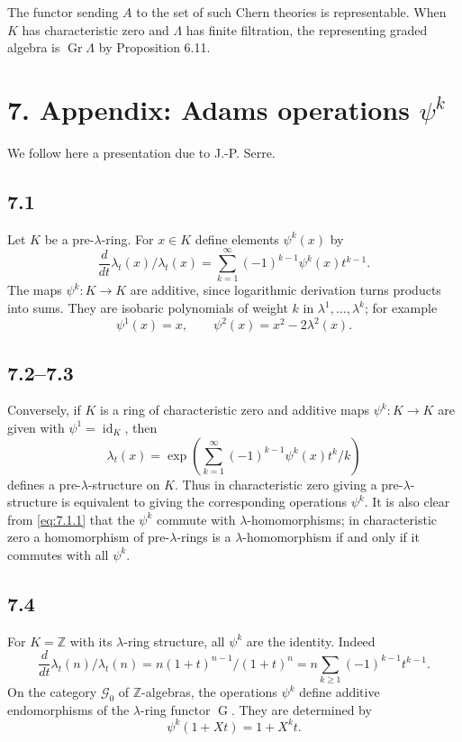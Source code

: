 \documentclass[11pt]{article}
\theoremstyle{plain}
\theoremstyle{definition}
\theoremstyle{remark}
\newcommand{\ZZ}{\mathbb Z}
\DeclareMathOperator{\Gr}{Gr}
\DeclareMathOperator{\id}{id}
\providecommand{\Go}{\operatorname{G}}
\begin{document}
The functor sending $A$ to the set of such Chern theories is representable. When $K$ has characteristic zero and $\Lambda$ has finite filtration, the representing graded algebra is $\Gr\Lambda$ by Proposition 6.11.

\section*{7. Appendix: Adams operations $\psi^k$}

We follow here a presentation due to J.-P. Serre.

\subsection*{7.1}
Let $K$ be a pre-$\lambda$-ring. For $x\in K$ define elements $\psi^k(x)$ by
\begin{equation}\label{eq:7.1.1}
\frac{d}{dt}\lambda_t(x)\big/\lambda_t(x)=\sum_{k=1}^{\infty}(-1)^{k-1}\psi^k(x)t^{k-1}.
\end{equation}
The maps $\psi^k:K\to K$ are additive, since logarithmic derivation turns products into sums. They are isobaric polynomials of weight $k$ in $\lambda^1,\ldots,\lambda^k$; for example
\[
\psi^1(x)=x,
\qquad
\psi^2(x)=x^2-2\lambda^2(x).
\]

\subsection*{7.2--7.3}
Conversely, if $K$ is a ring of characteristic zero and additive maps $\psi^k:K\to K$ are given with $\psi^1=\id_K$, then
\begin{equation}\label{eq:7.2.1}
\lambda_t(x)=\exp\left(\sum_{k=1}^{\infty}(-1)^{k-1}\psi^k(x)t^k/k\right)
\end{equation}
defines a pre-$\lambda$-structure on $K$. Thus in characteristic zero giving a pre-$\lambda$-structure is equivalent to giving the corresponding operations $\psi^k$. It is also clear from \eqref{eq:7.1.1} that the $\psi^k$ commute with $\lambda$-homomorphisms; in characteristic zero a homomorphism of pre-$\lambda$-rings is a $\lambda$-homomorphism if and only if it commutes with all $\psi^k$.

\subsection*{7.4}
For $K=\ZZ$ with its $\lambda$-ring structure, all $\psi^k$ are the identity. Indeed
\[
\frac{d}{dt}\lambda_t(n)\big/\lambda_t(n)=n(1+t)^{n-1}/(1+t)^n=n\sum_{k\geq 1}(-1)^{k-1}t^{k-1}.
\]
On the category $\mathcal G_0$ of $\ZZ$-algebras, the operations $\psi^k$ define additive endomorphisms of the $\lambda$-ring functor $\Go$. They are determined by
\begin{equation}\label{eq:7.4.1}
\psi^k(1+Xt)=1+X^kt.
\end{equation}
\end{document}
